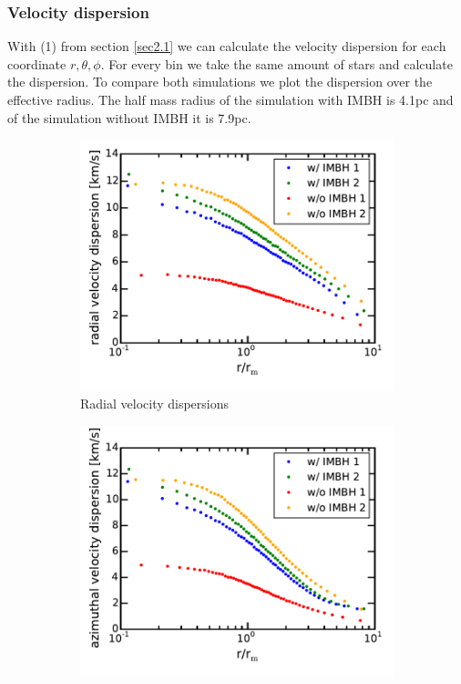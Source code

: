 \subsubsection{Velocity dispersion}
With (1) from section \ref{sec2.1} we can calculate the velocity dispersion for each coordinate \(r,\theta,\phi\). For every bin we take the same amount of stars and calculate the dispersion. To compare both simulations we plot the dispersion over the effective radius. The half mass radius of the simulation with \ac{IMBH} is 4.1pc and of the simulation without \ac{IMBH} it is 7.9pc. 
\begin{figure}[htbp]
	\centering
	\begin{subfigure}{0.475\textwidth}
		\centering
		\includegraphics[width=\textwidth]{Plots/radial_velocity_dispersion.pdf}
		\caption{Radial velocity dispersions}
		\label{[fig:radial_vel_disp]}
	\end{subfigure}
	\hfill
	\begin{subfigure}{0.475\textwidth}
		\centering
		\includegraphics[width=\textwidth]{Plots/azimuthal_velocity_dispersion.pdf}

\end{subfigure}
\end{figure}
